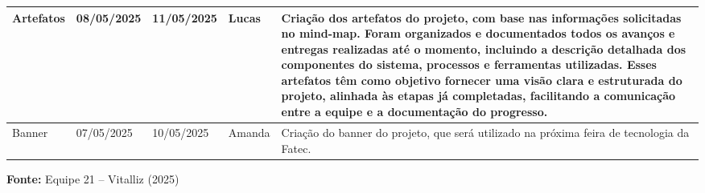 \begin{center}
\begin{adjustbox}{max width=\textwidth}
\begin{tabular}{|m{4cm}|m{2.2cm}|m{2.2cm}|m{3cm}|m{8cm}|}
Artefatos & 08/05/2025 & 11/05/2025 & Lucas &
Criação dos artefatos do projeto, com base nas informações solicitadas no mind-map. Foram organizados e documentados todos os avanços e entregas realizadas até o momento, incluindo a descrição detalhada dos componentes do sistema, processos e ferramentas utilizadas. Esses artefatos têm como objetivo fornecer uma visão clara e estruturada do projeto, alinhada às etapas já completadas, facilitando a comunicação entre a equipe e a documentação do progresso. \\ \hline

Banner & 07/05/2025 & 10/05/2025 & Amanda &
Criação do banner do projeto, que será utilizado na próxima feira de tecnologia da Fatec. \\ \hline

\end{tabular}
\end{adjustbox}

\vspace{0.3em}
\small{\textbf{Fonte:} Equipe 21 – Vitalliz (2025)}

\end{center}

